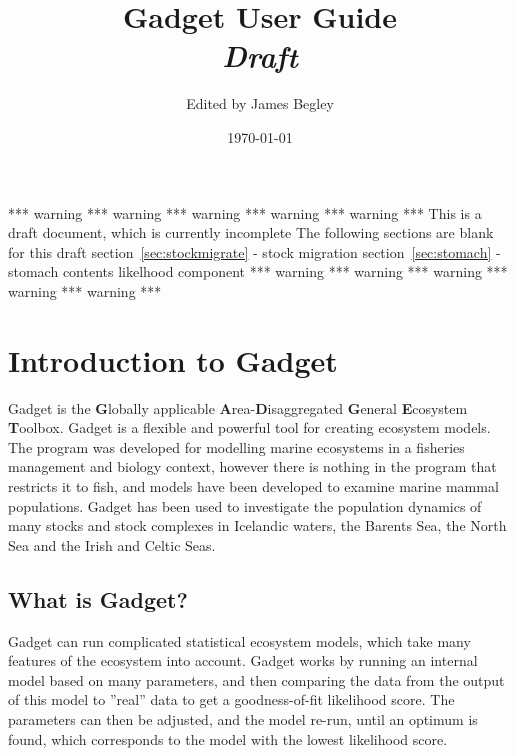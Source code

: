 \documentclass [a4paper, 10pt]{book}
\begin{document}
\title{\Huge{Gadget User Guide}\\ \huge{\textit{Draft}}}
\author{Edited by James Begley}
\date{\today}
\maketitle

\setlength{\parindent}{0pt}

\tableofcontents

\newpage
*** warning *** warning *** warning *** warning *** warning ***\newline
\newline
This is a draft document, which is currently incomplete\newline
The following sections are blank for this draft\newline
\newline
section~\ref{sec:stockmigrate} - stock migration\newline
section~\ref{sec:stomach} - stomach contents likelhood component\newline
\newline
*** warning *** warning *** warning *** warning *** warning ***\newline

\newpage
{}

\chapter{Introduction to Gadget}\label{chap:intro}
Gadget is the {\bf G}lobally applicable {\bf A}rea-{\bf D}isaggregated {\bf G}eneral {\bf E}cosystem {\bf T}oolbox.  Gadget is a flexible and powerful tool for creating ecosystem models.  The program was developed for modelling marine ecosystems in a fisheries management and biology context, however there is nothing in the program that restricts it to fish, and models have been developed to examine marine mammal populations.  Gadget has been used to investigate the population dynamics of many stocks and stock complexes in Icelandic waters, the Barents Sea, the North Sea and the Irish and Celtic Seas.

\section{What is Gadget?}\label{sec:whatisgadget}
Gadget can run complicated statistical ecosystem models, which take many features of the ecosystem into account. Gadget works by running an internal model based on many parameters, and then comparing the data from the output of this model to ''real'' data to get a goodness-of-fit likelihood score.  The parameters can then be adjusted, and the model re-run, until an optimum is found, which corresponds to the model with the lowest likelihood score.
\end{document}
